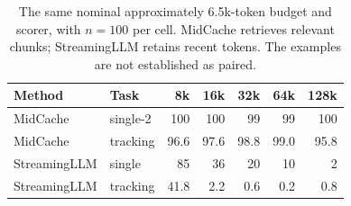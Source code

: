 \begin{table}[htbp]
\centering
\small
\setlength{\tabcolsep}{4pt}
\begin{tabular}{@{}llrrrrr@{}}
\toprule
Method & Task & 8k & 16k & 32k & 64k & 128k \\
\midrule
MidCache & single-2 & 100 & 100 & 99 & 99 & 100 \\
MidCache & tracking & 96.6 & 97.6 & 98.8 & 99.0 & 95.8 \\
StreamingLLM & single & 85 & 36 & 20 & 10 & 2 \\
StreamingLLM & tracking & 41.8 & 2.2 & 0.6 & 0.2 & 0.8 \\
\bottomrule
\end{tabular}
\caption{The same nominal approximately 6.5k-token budget and scorer, with $n=100$ per cell. MidCache retrieves relevant chunks; StreamingLLM retains recent tokens. The examples are not established as paired.}
\label{tab:equal-budget}
\end{table}
